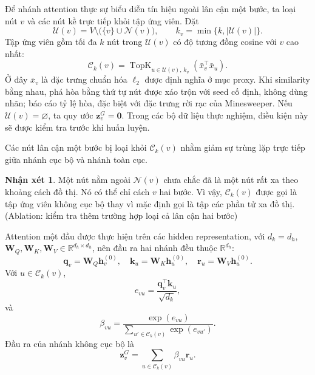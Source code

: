 \documentclass[12pt,a4paper]{article}
\numberwithin{equation}{section}
\theoremstyle{definition}
\newtheorem{remark}{Nhận xét}[section]
\begin{document}
Để nhánh attention thực sự biểu diễn tín hiệu ngoài lân cận một bước,
ta loại nút $v$ và các nút kề trực tiếp khỏi tập ứng viên. Đặt
\[
\mathcal{U}(v)
=
V \setminus \bigl(\{v\}\cup\mathcal{N}(v)\bigr),
\qquad
k_v=\min\{k,|\mathcal{U}(v)|\}.
\]
Tập ứng viên gồm tối đa $k$ nút trong $\mathcal{U}(v)$ có độ tương đồng
cosine với $v$ cao nhất:
\[
\mathcal{C}_k(v)
=
\operatorname{TopK}_{u\in\mathcal{U}(v),\,k_v}
\left(\bar{x}_v^\top\bar{x}_u\right).
\]
Ở đây $\bar{x}_v$ là đặc trưng chuẩn hóa $\ell_2$ được định nghĩa ở mục proxy. Khi similarity bằng nhau, phá hòa bằng thứ tự nút được xáo trộn với seed cố định, không dùng nhãn; báo cáo tỷ lệ hòa, đặc biệt với đặc trưng rời rạc của Minesweeper. Nếu $\mathcal{U}(v)=\varnothing$, ta quy ước $\mathbf{z}_v^G=\mathbf{0}$.
Trong các bộ dữ liệu thực nghiệm, điều kiện này sẽ được kiểm tra trước
khi huấn luyện.

Các nút lân cận một bước bị loại khỏi $\mathcal{C}_k(v)$ nhằm giảm sự trùng lặp trực tiếp giữa nhánh cục bộ và nhánh toàn cục.

\begin{remark}
Một nút nằm ngoài $\mathcal{N}(v)$ chưa chắc đã là một nút rất xa theo khoảng cách đồ thị. Nó có thể chỉ cách $v$ hai bước. Vì vậy, $\mathcal{C}_k(v)$ được gọi là tập ứng viên không cục bộ thay vì mặc định gọi là tập các phần tử xa đồ thị. (Ablation: kiểm tra thêm trường hợp loại cả lân cận hai bước)
\end{remark}

Attention một đầu được thực hiện trên các hidden representation, với $d_k=d_h$, $\mathbf{W}_Q,\mathbf{W}_K,\mathbf{W}_V\in\mathbb{R}^{d_h\times d_h}$, nên đầu ra hai nhánh đều thuộc $\mathbb{R}^{d_h}$:
\begin{equation}
\mathbf{q}_v = \mathbf{W}_Q\mathbf{h}_v^{(0)}, \quad \mathbf{k}_u = \mathbf{W}_K\mathbf{h}_u^{(0)}, \quad \mathbf{r}_u = \mathbf{W}_V\mathbf{h}_u^{(0)}.
\end{equation}
Với $u \in \mathcal{C}_k(v)$,
\begin{equation}
e_{vu} = \frac{\mathbf{q}_v^\top \mathbf{k}_u}{\sqrt{d_k}},
\end{equation}
và
\begin{equation}
\beta_{vu} = \frac{\exp(e_{vu})}{\sum_{u' \in \mathcal{C}_k(v)} \exp(e_{vu'})}.
\end{equation}
Đầu ra của nhánh không cục bộ là
\begin{equation}
\mathbf{z}_v^G = \sum_{u \in \mathcal{C}_k(v)} \beta_{vu}\mathbf{r}_u.
\end{equation}
\end{document}
